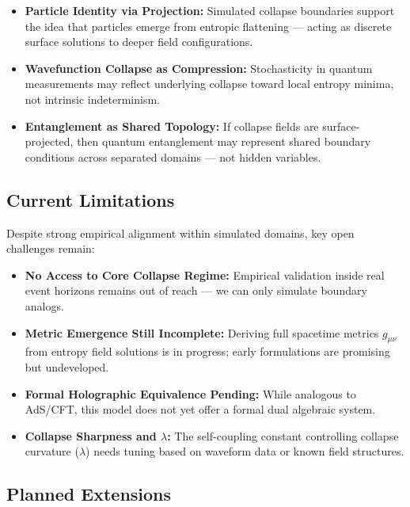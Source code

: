 \documentclass[12pt]{article}
\begin{document}
\FloatBarrier
\begin{itemize}[leftmargin=1.5em]
  \item \textbf{Particle Identity via Projection:} Simulated collapse boundaries support the idea that particles emerge from entropic flattening — acting as discrete surface solutions to deeper field configurations.

  \item \textbf{Wavefunction Collapse as Compression:} Stochasticity in quantum measurements may reflect underlying collapse toward local entropy minima, not intrinsic indeterminism.

  \item \textbf{Entanglement as Shared Topology:} If collapse fields are surface-projected, then quantum entanglement may represent shared boundary conditions across separated domains — not hidden variables.
\end{itemize}

\clearpage
\subsection*{Current Limitations}

\FloatBarrier
Despite strong empirical alignment within simulated domains, key open challenges remain:

\begin{itemize}[leftmargin=1.5em]
  \item \textbf{No Access to Core Collapse Regime:} Empirical validation inside real event horizons remains out of reach — we can only simulate boundary analogs.

  \item \textbf{Metric Emergence Still Incomplete:} Deriving full spacetime metrics $g_{\mu\nu}$ from entropy field solutions is in progress; early formulations are promising but undeveloped.

  \item \textbf{Formal Holographic Equivalence Pending:} While analogous to AdS/CFT, this model does not yet offer a formal dual algebraic system.

  \item \textbf{Collapse Sharpness and $\lambda$:} The self-coupling constant controlling collapse curvature ($\lambda$) needs tuning based on waveform data or known field structures.
\end{itemize}
\FloatBarrier

\clearpage
\subsection*{Planned Extensions}
\end{document}
